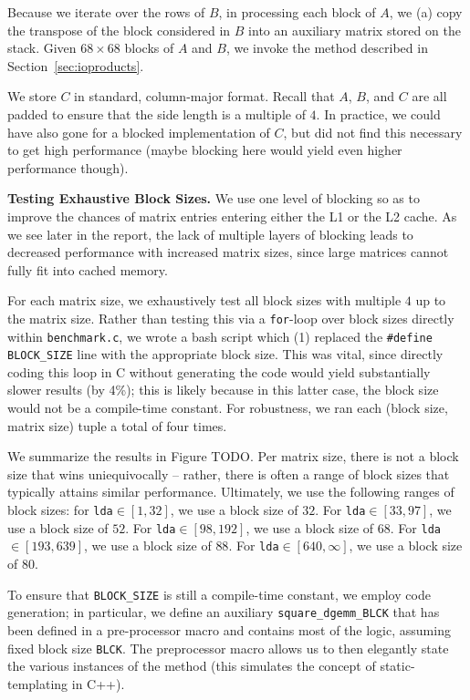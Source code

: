 \documentclass{article} %
\begin{document}
Because we iterate over the rows of $B$, in processing
each block of $A$, we (a) copy the transpose of the block considered in $B$ into
an auxiliary matrix stored on the stack. Given $68\times 68$ blocks of $A$ and
$B$, we invoke the method described in Section~\ref{sec:ioproducts}.

We store $C$ in standard, column-major format. Recall that $A$, $B$, and $C$
are all padded to ensure that the side length is a multiple of $4$. In practice,
we could have also gone for a blocked implementation of $C$, but did not find
this necessary to get high performance (maybe blocking here would yield even
higher performance though).

\textbf{Testing Exhaustive Block Sizes.} We use one level
of blocking so as to improve the chances of matrix entries entering either the
L1 or the L2 cache. As we see later in the report, the lack of multiple layers
of blocking leads to decreased performance with increased matrix sizes, since
large matrices cannot fully fit into cached memory.

For each matrix size, we exhaustively test all block sizes with multiple $4$ up
to the matrix size. Rather than testing this via a \texttt{for}-loop over block sizes
directly within \texttt{benchmark.c}, we wrote a bash script which (1) replaced the
\texttt{\#define BLOCK\_SIZE} line with the appropriate block size. This was vital,
since directly coding this loop in C without generating the code would yield
substantially slower results (by 4\%); this is likely because in this latter case,
the block size would not be a compile-time constant. For robustness, we ran each
(block size, matrix size) tuple a total of four times.

We summarize the results in Figure TODO. Per matrix size, there is not a block size
that wins uniequivocally -- rather, there is often a range of block sizes that typically
attains similar performance. Ultimately, we use the following ranges of block sizes:
for \texttt{lda}$\in [1, 32]$, we use a block size of $32$. For \texttt{lda}$\in [33, 97]$,
we use a block size of $52$. For \texttt{lda}$\in [98, 192]$, we use a block size of $68$.
For \texttt{lda}$\in [193, 639]$, we use a block size of $88$. For \texttt{lda}$\in [640, \infty]$,
we use a block size of $80$.

To ensure that \texttt{BLOCK\_SIZE} is still a compile-time constant, we employ
code generation; in particular, we define an auxiliary \texttt{square\_dgemm\_BLCK} that
has been defined in a pre-processor macro and contains most of the logic, assuming fixed block
size \texttt{BLCK}. The preprocessor macro allows us to then elegantly state the various
instances of the method (this simulates the concept of static-templating in C++).
\end{document}
